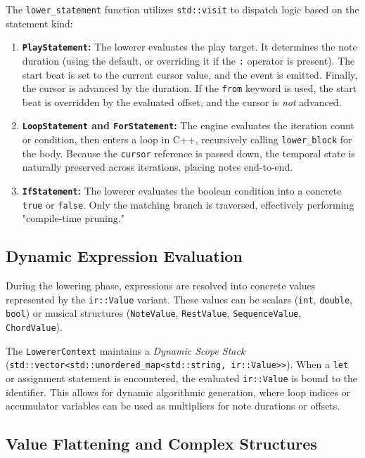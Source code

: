 The \texttt{lower\_statement} function utilizes \texttt{std::visit} to dispatch logic based on the statement kind:
\begin{enumerate}
    \item \textbf{\texttt{PlayStatement}:} The lowerer evaluates the play target. It determines the note duration (using the default, or overriding it if the \texttt{:} operator is present). The start beat is set to the current cursor value, and the event is emitted. Finally, the cursor is advanced by the duration. If the \texttt{from} keyword is used, the start beat is overridden by the evaluated offset, and the cursor is \textit{not} advanced.
    \item \textbf{\texttt{LoopStatement} and \texttt{ForStatement}:} The engine evaluates the iteration count or condition, then enters a loop in C++, recursively calling \texttt{lower\_block} for the body. Because the \texttt{cursor} reference is passed down, the temporal state is naturally preserved across iterations, placing notes end-to-end.
    \item \textbf{\texttt{IfStatement}:} The lowerer evaluates the boolean condition into a concrete \texttt{true} or \texttt{false}. Only the matching branch is traversed, effectively performing "compile-time pruning."
\end{enumerate}

\subsection{Dynamic Expression Evaluation}

During the lowering phase, expressions are resolved into concrete values represented by the \texttt{ir::Value} variant.
These values can be scalars (\texttt{int}, \texttt{double}, \texttt{bool}) or musical structures (\texttt{NoteValue}, \texttt{RestValue}, \texttt{SequenceValue}, \texttt{ChordValue}).

The \texttt{LowererContext} maintains a \textit{Dynamic Scope Stack} (\texttt{std::vector<std::unordered\_map<std::string, ir::Value>>}).
When a \texttt{let} or assignment statement is encountered, the evaluated \texttt{ir::Value} is bound to the identifier.
This allows for dynamic algorithmic generation, where loop indices or accumulator variables can be used as multipliers for note durations or offsets.

\subsection{Value Flattening and Complex Structures}

